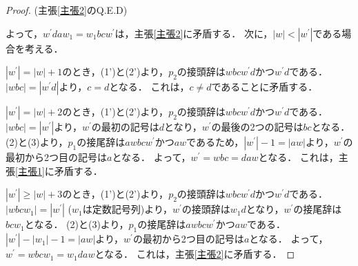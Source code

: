 \begin{proof}
\hspace{\fill}\rm{(主張\ref{主張2}のQ.E.D)}

よって，$w^{\prime}daw_{1}=w_{1}bcw^{\prime}$は，主張\ref{主張2}に矛盾する．
次に，$|w| < |w^{\prime}|$である場合を考える．

$|w^{\prime}|=|w|+1$のとき，(1')と(2')より，$p_{2}$の接頭辞は$wbcw^{\prime}d$かつ$w^{\prime}d$である．
$|wbc|=|w^{\prime}d|$より，$c=d$となる．
これは，$c \ne d$であることに矛盾する．

$|w^{\prime}|=|w|+2$のとき，(1')と(2')より，$p_{2}$の接頭辞は$wbcw^{\prime}d$かつ$w^{\prime}d$である．
$|wbc|=|w^{\prime}|$より，$w^{\prime}$の最初の記号は$d$となり，$w^{\prime}$の最後の2つの記号は$bc$となる．
(2)と(3)より，$p_{1}$の接尾辞は$awbcw^{\prime}$かつ$aw$であるため，$|w^{\prime}|-1=|aw|$より，$w^{\prime}$の最初から2つ目の記号は$a$となる．
よって，$w^{\prime}=wbc=daw$となる．
これは，主張\ref{主張1}に矛盾する．

$|w^{\prime}| \ge |w|+3$のとき，(1')と(2')より，$p_{2}$の接頭辞は$wbcw^{\prime}d$かつ$w^{\prime}d$である．
$|wbcw_{1}|=|w^{\prime}|$ ($w_{1}$は定数記号列)より，$w^{\prime}$の接頭辞は$w_{1}d$となり，$w^{\prime}$の接尾辞は$bcw_{1}$となる．
(2)と(3)より，$p_{1}$の接尾辞は$awbcw^{\prime}$かつ$aw$である．
$|w^{\prime}|-|w_{1}|-1=|aw|$より，$w^{\prime}$の最初から2つ目の記号は$a$となる．
よって，$w^{\prime}=wbcw_{1}=w_{1}daw$となる．
これは，主張\ref{主張2}に矛盾する．
\end{proof}

